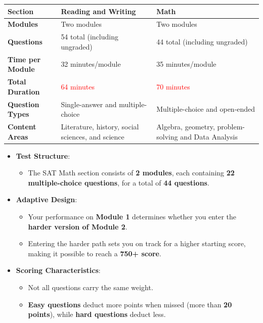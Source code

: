 \documentclass{article}
\begin{document}
\begin{tcolorbox}[colback=Lavender!6, colframe=RoyalBlue, coltitle=white,
title=\textbf{SAT Test Components}, sharp corners=all, width=168mm, boxrule=0.8mm]

\begin{center}
\begin{tabular}{|p{4cm}|p{5cm}|p{5cm}|}
\hline
 \textbf{Section} & \textbf{Reading and Writing} & \textbf{Math} \\ \hline
\textbf{Modules} & Two modules & Two modules \\ \hline
\textbf{Questions} & 54 total (including ungraded) & 44 total (including ungraded) \\ \hline
\textbf{Time per Module} & 32 minutes/module & 35 minutes/module \\ \hline
\textbf{Total Duration} & \textcolor{Red}{64 minutes} & \textcolor{Red}{70 minutes} \\ \hline
\textbf{Question Types} & Single-answer and multiple-choice & Multiple-choice and open-ended \\ \hline
\textbf{Content Areas} & Literature, history, social sciences, and science & Algebra, geometry, problem-solving and Data Analysis \\ \hline
\end{tabular}
\end{center}

\begin{itemize}
  \item \textbf{Test Structure}:
  \begin{itemize}
    \item The SAT Math section consists of \textbf{2 modules}, each containing \textbf{22 multiple-choice questions}, for a total of \textbf{44 questions}.
  \end{itemize}
  
  \item \textbf{Adaptive Design}:
  \begin{itemize}
    \item Your performance on \textbf{Module 1} determines whether you enter the \textbf{harder version of Module 2}.
    \item Entering the harder path sets you on track for a higher starting score, making it possible to reach a \textbf{750+ score}.
  \end{itemize}
  
  \item \textbf{Scoring Characteristics}:
  \begin{itemize}
    \item Not all questions carry the same weight.
    \item \textbf{Easy questions} deduct more points when missed (more than \textbf{20 points}), while \textbf{hard questions} deduct less.
  \end{itemize}
  

\end{itemize}
\end{tcolorbox}
\end{document}
